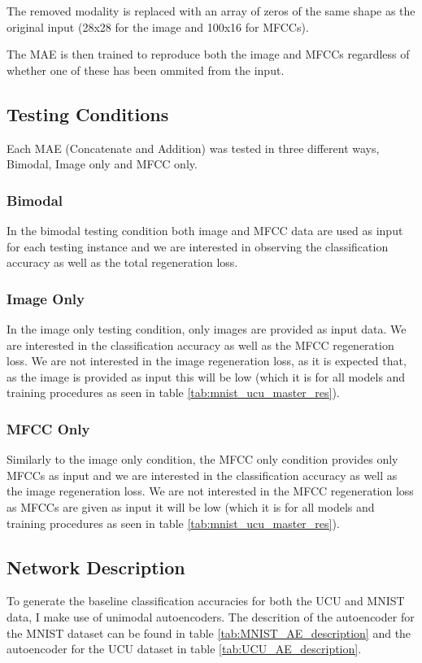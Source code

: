 The removed modality is replaced with an array of zeros of the same shape as the original input (28x28 for the image and 100x16 for MFCCs).

The MAE is then trained to reproduce both the image and MFCCs regardless of whether one of these has been ommited from the input.

\subsection{Testing Conditions}
Each MAE (Concatenate and Addition) was tested in three different ways, Bimodal, Image only and MFCC only.

\subsubsection{Bimodal}
In the bimodal testing condition both image and MFCC data are used as input for each testing instance and we are interested in observing the classification accuracy as well as the total regeneration loss.

\subsubsection{Image Only}
In the image only testing condition, only images are provided as input data. We are interested in the classification accuracy as well as the MFCC regeneration loss. We are not interested in the image regeneration loss, as it is expected that, as the image is provided as input this will be low (which it is for all models and training procedures as seen in table \ref{tab:mnist_ucu_master_res}).  

\subsubsection{MFCC Only}
Similarly to the image only condition, the MFCC only condition provides only MFCCs as input and we are interested in the classification accuracy as well as the image regeneration loss. We are not interested in the MFCC regeneration loss as MFCCs are given as input it will be low (which it is for all models and training procedures as seen in table \ref{tab:mnist_ucu_master_res}).  

\subsection{Network Description}
To generate the baseline classification accuracies for both the UCU and MNIST data, I make use of unimodal autoencoders. The descrition of the autoencoder for the MNIST dataset can be found in table \ref{tab:MNIST_AE_description} and the autoencoder for the UCU dataset in table \ref{tab:UCU_AE_description}.

